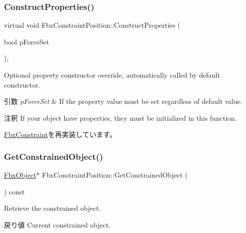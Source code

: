 \subsubsection{\texorpdfstring{Construct\+Properties()}{ConstructProperties()}}
{\footnotesize\ttfamily virtual void Fbx\+Constraint\+Position\+::\+Construct\+Properties (\begin{DoxyParamCaption}\item[{bool}]{p\+Force\+Set }\end{DoxyParamCaption})\hspace{0.3cm}{\ttfamily [protected]}, {\ttfamily [virtual]}}

Optional property constructor override, automatically called by default constructor. 
\begin{DoxyParams}{引数}
{\em p\+Force\+Set} & If the property value must be set regardless of default value. \\
\hline
\end{DoxyParams}
\begin{DoxyRemark}{注釈}
If your object have properties, they must be initialized in this function. 
\end{DoxyRemark}


\hyperlink{class_fbx_constraint_a0470a25b813b337d07a03ce4b97b44f8}{Fbx\+Constraint}を再実装しています。

\mbox{\label{class_fbx_constraint_position_a2722540075ef79aa2d14e7e838afaf79}} 
\subsubsection{\texorpdfstring{Get\+Constrained\+Object()}{GetConstrainedObject()}}
{\footnotesize\ttfamily \hyperlink{class_fbx_object}{Fbx\+Object}$\ast$ Fbx\+Constraint\+Position\+::\+Get\+Constrained\+Object (\begin{DoxyParamCaption}{ }\end{DoxyParamCaption}) const\hspace{0.3cm}{\ttfamily [virtual]}}

Retrieve the constrained object. \begin{DoxyReturn}{戻り値}
Current constrained object. 
\end{DoxyReturn}


